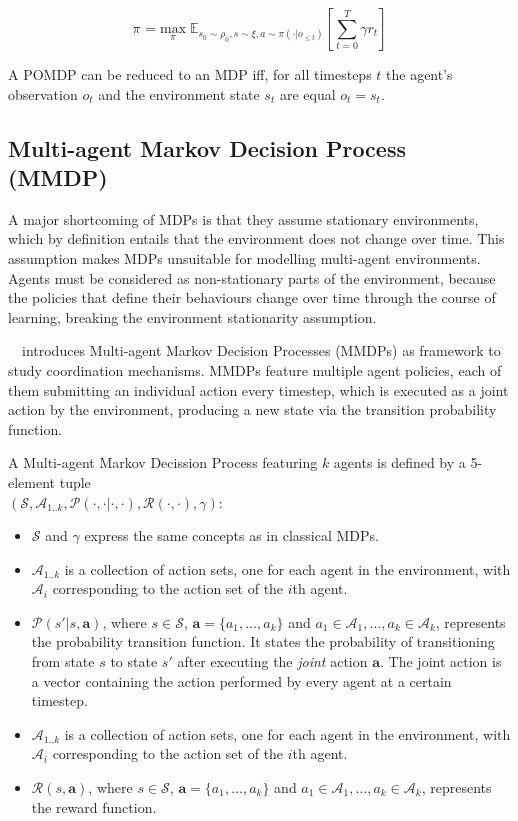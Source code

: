 \documentclass{../main.tex}{}
\begin{document}
        \begin{equation}
        \pi^{} = \underset{\pi}{\text{max}}\;  \mathbb{E}_{s_0 \sim \rho_0, s \sim \xi, a \sim \pi(\cdot | o_{\leq t})}[\sum_{t=0}^{T} \gamma r_t]
        \end{equation}

A POMDP can be reduced to an MDP iff, for all timesteps $t$ the agent's observation $o_t$ and the environment state $s_t$ are equal $o_t = s_t$.

\subsection{Multi-agent Markov Decision Process (MMDP)}

A major shortcoming of MDPs is that they assume stationary environments, which by definition entails that the environment does not change over time. This assumption makes MDPs unsuitable for modelling multi-agent environments. Agents must be considered as non-stationary parts of the environment, because the policies that define their behaviours change over time through the course of learning, breaking the environment stationarity assumption.

~\cite{Boutilier1996}~introduces Multi-agent Markov Decision Processes (MMDPs) as framework to study coordination mechanisms. MMDPs feature multiple agent policies, each of them submitting an individual action every timestep, which is executed as a joint action by the environment, producing a new state via the transition probability function. 

A Multi-agent Markov Decission Process featuring $k$ agents is defined by a 5-element tuple \\ $(\mathcal{S}, \mathcal{A}_{1..k}, \mathcal{P}(\cdot, \cdot | \cdot, \cdot), \mathcal{R}(\cdot, \cdot), \gamma)$:
\begin{itemize}
    \item $\mathcal{S}$ and $\gamma$ express the same concepts as in classical MDPs.
    \item $\mathcal{A}_{1..k}$ is a collection of action sets, one for each agent in the environment, with $\mathcal{A}_i$ corresponding to the action set of the $i$th agent.
    \item $\mathcal{P}(s' | s, \mathbf{a})$, where $s \in \mathcal{S}$, $\mathbf{a} = \{a_1,\ldots,a_k\}$ and $a_1 \in \mathcal{A}_1, \ldots, a_k \in \mathcal{A}_k$, represents the probability transition function. It states the probability of transitioning from state $s$ to state $s'$ after executing the \textit{joint} action $\mathbf{a}$. The joint action is a vector containing the action performed by every agent at a certain timestep.    \item $\mathcal{A}_{1..k}$ is a collection of action sets, one for each agent in the environment, with $\mathcal{A}_i$ corresponding to the action set of the $i$th agent.
    \item $\mathcal{R}(s, \mathbf{a})$, where $s \in \mathcal{S}$, $\mathbf{a} = \{a_1,\ldots,a_k\}$ and $a_1 \in \mathcal{A}_1, \ldots, a_k \in \mathcal{A}_k$, represents the reward function.
\end{itemize}
\end{document}
